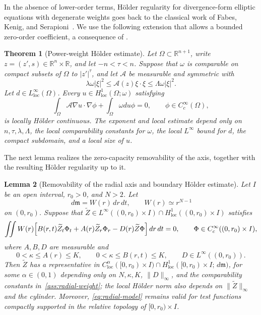 \documentclass[11pt]{amsart}
\newtheorem{theorem}{Theorem}[section]
\newtheorem{lemma}[theorem]{Lemma}
\newcommand{\R}{\mathbb R}
\newcommand{\dd}{\,d}
\newcommand{\loc}{\mathrm{loc}}
\begin{document}
In the absence of lower-order terms, H\"older regularity for
divergence-form elliptic equations with degenerate weights goes back to
the classical work of Fabes, Kenig, and Serapioni~\cite{FKS82}. We use the following
extension that allows a bounded zero-order coefficient, a consequence of
\cite[Thm.~5.2 and Lem.~5.1]{Zamboni}.

\begin{theorem}[Power-weight H\"older estimate]
\label{thm:zamboni}
Let \(\Omega\subset\R^{n+1}\), write \(z=(z',s)\in\R^n\times\R\), and let
\(-n<\tau<n\). Suppose that \(\omega\) is comparable on compact subsets of
\(\Omega\) to \(|z'|^\tau\), and let \(\mathcal A\) be measurable and symmetric
with
\[
        \lambda \omega|\xi|^2
        \le \mathcal A(z)\xi\cdot\xi
        \le \Lambda\omega|\xi|^2 .
\]
Let \(d\in L^\infty_{\loc}(\Omega)\). Every
\(u\in H^1_{\loc}(\Omega;\omega)\) satisfying
\[
        \int_\Omega \mathcal A\nabla u\cdot\nabla\phi
        +\int_\Omega \omega d u\phi=0,\qquad \phi\in C_c^\infty(\Omega),
\]
is locally H\"older continuous. The exponent and local estimate depend only on
\(n,\tau,\lambda,\Lambda\), the local comparability constants for \(\omega\),
the local \(L^\infty\) bound for \(d\), the compact subdomain, and a local size
of \(u\).
\end{theorem}

The next lemma realizes the zero-capacity removability of the axis, together with the resulting H\"older
regularity up to it.

\begin{lemma}[Removability of the radial axis and boundary H\"older estimate]
\label{lem:radial-regularity}
Let \(I\) be an open interval, \(r_0>0\), and \(N>2\). Let
\begin{equation}
\label{ass:radial-weight}
        \dd\mathfrak m=W(r)\dd r\dd t,\qquad W(r)\simeq r^{N-1}
\end{equation}
on \((0,r_0)\). Suppose that
\(\widetilde Z\in L^\infty((0,r_0)\times I)\cap H^1_{\loc}((0,r_0)\times I)\) satisfies
\begin{equation}
\label{eq:radial-model}
        \iint W(r)\Bigl[
        B(r,t)\widetilde Z_t\Phi_t+A(r)\widetilde Z_r\Phi_r-D(r)\widetilde Z\Phi
        \Bigr]\dd r\dd t=0,
        \qquad \Phi\in C_c^\infty((0,r_0)\times I),
\end{equation}
where \(A,B,D\) are measurable and
\begin{equation}
\label{ass:radial-coefficients}
        0<\kappa\le A(r)\le K,\qquad
        0<\kappa\le B(r,t)\le K,
        \qquad D\in L^\infty((0,r_0)).
\end{equation}
Then \(\widetilde Z\) has a representative in
\(C^\alpha_{\loc}([0,r_0)\times I)\cap
H^1_{\loc}([0,r_0)\times I;\dd\mathfrak m)\), for some \(\alpha\in(0,1)\)
depending only on \(N,\kappa,K\), \(\|D\|_\infty\), and the comparability
constants in~\eqref{ass:radial-weight}; the local H\"older norm also depends
on \(\|\widetilde Z\|_\infty\) and the cylinder. Moreover, \eqref{eq:radial-model}
remains valid for test functions compactly supported in the relative
topology of \([0,r_0)\times I\).
\end{lemma}
\end{document}
